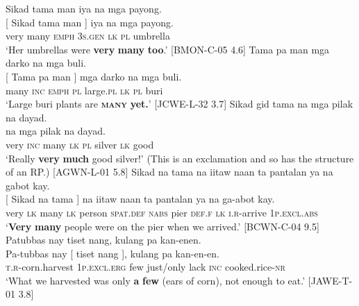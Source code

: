 \ea
Sikad  tama  man  iya  na  mga  payong. \\\smallskip
 \gll {}[ Sikad  tama  man ]  iya  na  mga  payong. \\
{} very  many  \textsc{emph} {} 3\textsc{s.gen}  \textsc{lk}  \textsc{pl}  umbrella \\
\glt ‘Her umbrellas were \textbf{very} \textbf{many} \textbf{too}.’ [BMON-C-05 4.6]
\z
\ea
Tama  pa  man  mga  darko  na  mga  buli. \\\smallskip
 \gll {}[ Tama  pa  man ]  mga  darko  na  mga  buli. \\
{} many  \textsc{inc}  \textsc{emph}  {} \textsc{pl}  large.\textsc{pl}  \textsc{lk}  \textsc{pl}  buri \\
\glt ‘Large buri plants are \textbf{\textsc{many}} \textbf{yet.}’ [JCWE-L-32 3.7]
\z
\ea
Sikad  gid  tama   na  mga  pilak  na  dayad. \\\smallskip
   na  mga  pilak  na  dayad. \\
{} very  \textsc{inc}  many {} \textsc{lk}  \textsc{pl}  silver  \textsc{lk}  good \\
\glt ‘Really \textbf{very} \textbf{much} good silver!’ (This is an exclamation and so has the structure of an RP.) [AGWN-L-01 5.8]
\z
\ea
Sikad  na  tama  na  iitaw  naan  ta  pantalan  ya  na gabot kay. \\\smallskip
 \gll {}[ Sikad  na  tama ]  na  iitaw  naan  ta  pantalan  ya  na ga-abot kay. \\
{} very  \textsc{lk}  many {} \textsc{lk}  person  \textsc{spat.def}  \textsc{nabs}  pier  \textsc{def.f}  \textsc{lk}
\textsc{i.r}-arrive 1\textsc{p.excl.abs} \\
\glt ‘\textbf{Very} \textbf{many} people were on the pier when we arrived.’ [BCWN-C-04 9.5]
\z
\ea
Patubbas  nay   tiset  nang,  kulang  pa  kan-enen. \\\smallskip
 \gll Pa-tubbas  nay  [ tiset  nang ],  kulang  pa  kan-en-en. \\
\textsc{t.r}-corn.harvest  1\textsc{p.excl.erg} {} few  just/only {} lack  \textsc{inc}  cooked.rice-\textsc{nr} \\
\glt ‘What we harvested was only \textbf{a} \textbf{few} (ears of corn), not enough to eat.’ [JAWE-T-01 3.8]
\z


